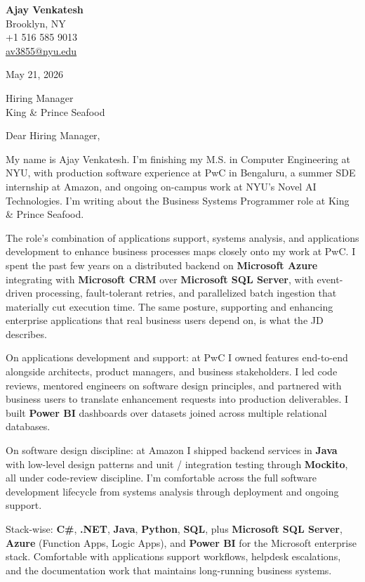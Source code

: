 \documentclass[letterpaper,11pt]{article}
\begin{document}
\begin{flushleft}
\textbf{\large Ajay Venkatesh} \\
Brooklyn, NY \\
+1 516 585 9013 \\
\href{mailto:av3855@nyu.edu}{av3855@nyu.edu}
\end{flushleft}
\vspace{10pt}
May 21, 2026
\vspace{6pt}

Hiring Manager \\
King \& Prince Seafood

\vspace{10pt}

Dear Hiring Manager,

My name is Ajay Venkatesh. I'm finishing my M.S. in Computer Engineering at NYU, with production software experience at PwC in Bengaluru, a summer SDE internship at Amazon, and ongoing on-campus work at NYU's Novel AI Technologies. I'm writing about the Business Systems Programmer role at King \& Prince Seafood.

The role's combination of applications support, systems analysis, and applications development to enhance business processes maps closely onto my work at PwC. I spent the past few years on a distributed backend on \textbf{Microsoft Azure} integrating with \textbf{Microsoft CRM} over \textbf{Microsoft SQL Server}, with event-driven processing, fault-tolerant retries, and parallelized batch ingestion that materially cut execution time. The same posture, supporting and enhancing enterprise applications that real business users depend on, is what the JD describes.

On applications development and support: at PwC I owned features end-to-end alongside architects, product managers, and business stakeholders. I led code reviews, mentored engineers on software design principles, and partnered with business users to translate enhancement requests into production deliverables. I built \textbf{Power BI} dashboards over datasets joined across multiple relational databases.

On software design discipline: at Amazon I shipped backend services in \textbf{Java} with low-level design patterns and unit / integration testing through \textbf{Mockito}, all under code-review discipline. I'm comfortable across the full software development lifecycle from systems analysis through deployment and ongoing support.

Stack-wise: \textbf{C\#}, \textbf{.NET}, \textbf{Java}, \textbf{Python}, \textbf{SQL}, plus \textbf{Microsoft SQL Server}, \textbf{Azure} (Function Apps, Logic Apps), and \textbf{Power BI} for the Microsoft enterprise stack. Comfortable with applications support workflows, helpdesk escalations, and the documentation work that maintains long-running business systems.
\end{document}
